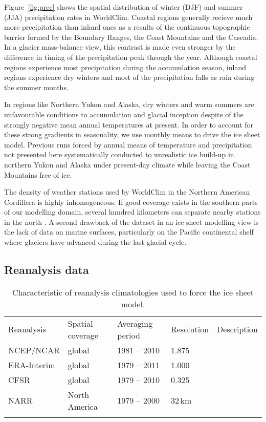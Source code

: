 Figure~\ref{fig:prec} shows the spatial distribution of winter (DJF) and summer (JJA) precipitation rates in WorldClim. Coastal regions generally recieve much more precipitation than inland ones as a results of the continuous topographic barrier formed by the Boundary Ranges, the Coast Mountains and the Cascadia. In a glacier mass-balance view, this contrast is made even stronger by the difference in timing of the precipitation peak through the year. Although coastal regions experience most precipitation during the accumulation season, inland regions experience dry winters and most of the precipitation falls as rain during the summer months.

In regions like Northern Yukon and Alaska, dry winters and warm summers are unfavourable conditions to accumulation and glacial inception despite of the strongly negative mean annual temperatures at present. In order to account for these strong gradients in seasonality, we use monthly means to drive the ice sheet model. Previous runs forced by annual means of temperature and precipitation not presented here systematically conducted to unrealistic ice build-up in northern Yukon and Alaska under present-day climate while leaving the Coast Mountains free of ice.

The density of weather stations used by WorldClim in the Northern American Cordillera is highly inhomogeneous. If good coverage exists in the southern parts of our modelling domain, several hundred kilometers can separate nearby stations in the north \citep{data:worldclim}. A second drawback of the dataset in an ice sheet modelling view is the lack of data on marine surfaces, particularly on the Pacific continental shelf where glaciers have advanced during the last glacial cycle\needref.


\subsection{Reanalysis data}

\begin{table*}[t]
	\caption{Characteristic of reanalysis climatologies used to force the ice sheet model.}
	\label{tab:reanalyses}
	\vskip4mm
	\centering
	\begin{tabular}{lllll}
		\tophline
		Reanalysis& Spatial coverage& Averaging period& Resolution& Description\\
		\middlehline
		NCEP/NCAR&  global&     1981 -- 2010& 1.875\degree& \citet{data:ncar}\\
		ERA-Interim&global&     1979 -- 2011& 1.000\degree& \citet{data:erai}\\
		CFSR&       global&     1979 -- 2010& 0.325\degree& \citet{data:cfsr}\\
		NARR&       North America& 1979 -- 2000& 32\,km& \citet{data:narr}\\
		\bottomhline
	\end{tabular}
\end{table*}

